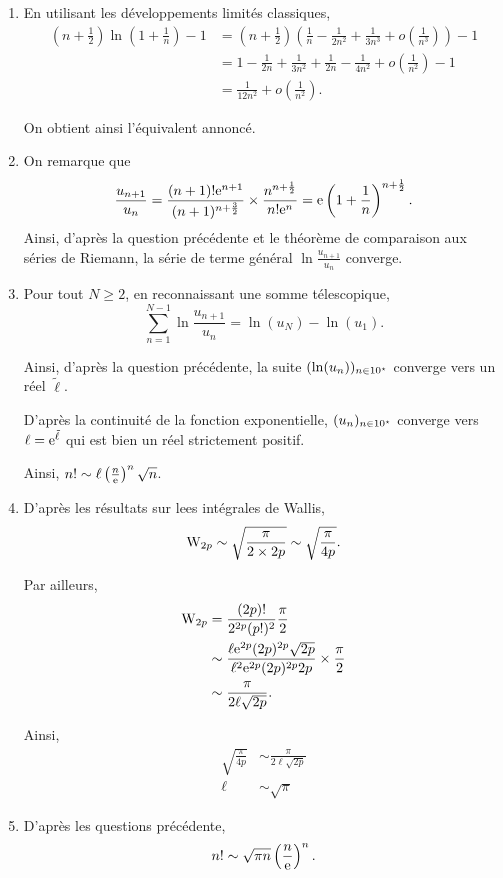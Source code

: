 \begin{preuve}
\begin{enumerate}
\item En utilisant les développements limités classiques,
\begin{align*}
\left(n + \frac{1}{2}\right) \ln\left(1 + \frac{1}{n}\right) - 1
&= \left(n + \frac{1}{2}\right) \left(\frac{1}{n} - \frac{1}{2 n^2} + \frac{1}{3 n^3} + o\left(\frac{1}{n^3}\right)\right) - 1\\
&= 1 - \frac{1}{2 n} + \frac{1}{3 n^2} + \frac{1}{2 n} - \frac{1}{4 n^2} + o\left(\frac{1}{n^2}\right) - 1\\
&= \frac{1}{12 n^2} + o\left(\frac{1}{n^2}\right).
\end{align*}

On obtient ainsi l'équivalent annoncé.

\item On remarque que
\[
\frac{u_{n+1}}{u_n}
= \frac{(n + 1)! \mathrm{e}^{n+1}}{(n+1)^{n+\frac{3}{2}}} \times \frac{n^{n+\frac{1}{2}}}{n! \mathrm{e}^n}
= \mathrm{e} \left(1 + \frac{1}{n}\right)^{n + \frac{1}{2}}.
\]
Ainsi, d'après la question précédente et le théorème de comparaison aux séries de Riemann, la série de terme général $\ln\frac{u_{n+1}}{u_n}$ converge.

\item Pour tout $N \geq 2$, en reconnaissant une somme télescopique,
\[
\sum_{n=1}^{N-1} \ln\frac{u_{n+1}}{u_n} = \ln(u_N) - \ln(u_1).
\]

Ainsi, d'après la question précédente, la suite $(\ln(u_n))_{n\in10^\star}$ converge vers un réel $\tilde{\ell}$.

D'après la continuité de la fonction exponentielle, $(u_n)_{n\in10^\star}$ converge vers $\ell = \mathrm{e}^{\tilde{\ell}}$ qui est bien un réel strictement positif.

Ainsi, $n! \sim \ell \left(\frac{n}{\mathrm{e}}\right)^n \sqrt{n}$.

\item D'après les résultats sur lees intégrales de Wallis,
\[
\mathrm{W}_{2p}
\sim \sqrt{\frac{\pi}{2\times 2p}}
\sim \sqrt{\frac{\pi}{4 p}}.
\]

Par ailleurs,
\begin{align*}
\mathrm{W}_{2p}
&= \frac{(2p)!}{2^{2p} (p!)^2} \frac{\pi}{2}\\
&\sim \frac{\ell \mathrm{e}^{2p} (2p)^{2p} \sqrt{2p}}{\ell^2 \mathrm{e}^{2p} (2p)^{2p} 2 p} \times \frac{\pi}{2}\\
&\sim \frac{\pi}{2 \ell \sqrt{2 p}}.
\end{align*}

Ainsi,
\begin{align*}
\sqrt{\frac{\pi}{4 p}} &\sim \frac{\pi}{2 \ell \sqrt{2p}}\\
\ell &\sim \sqrt{\pi}
\end{align*}

\item D'après les questions précédente,
\[
n! \sim \sqrt{\pi n} \left(\frac{n}{\mathrm{e}}\right)^n.
\]
\end{enumerate}
\end{preuve}

